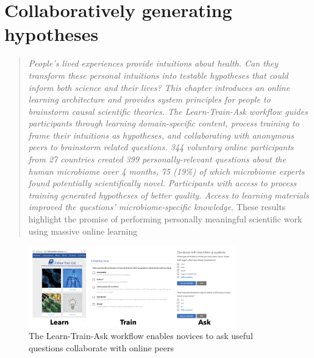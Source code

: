 \chapter{Collaboratively generating hypotheses}
\begin{quote}
\emph{People’s lived experiences provide intuitions about health.
Can they transform these personal intuitions into testable hypotheses
that could inform both science and their lives? This
chapter introduces an online learning architecture and provides
system principles for people to brainstorm causal scientific
theories. The Learn-Train-Ask workflow 
guides participants through learning domain-specific content,
process training to frame their intuitions as hypotheses,
and collaborating with anonymous peers to brainstorm related
questions. 344 voluntary online participants from 27
countries created 399 personally-relevant questions about the
human microbiome over 4 months, 75 (19\%) of which microbiome
experts found potentially scientifically novel. Participants
with access to process training generated
hypotheses of better quality. Access to learning materials improved
the questions’ microbiome-specific knowledge.}
These results highlight the promise of performing personally 
meaningful scientific work using massive online learning
\end{quote}

\begin{figure}[h] 
  \centering
  \includegraphics[width=0.8\textwidth]{figures/docent/fig-0.png}
  \caption[The Docent Learn-Train-Ask workflow]
{The Learn-Train-Ask workflow enables novices to ask useful questions collaborate with online peers}
  \label{fig:docent-0}
\end{figure}

\vspace{0.25in}


